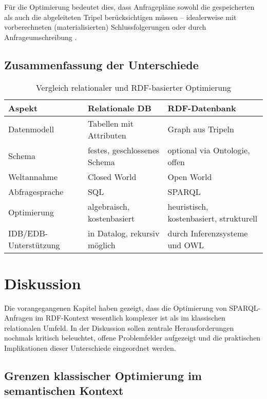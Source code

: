 \documentclass[12pt]{article}
\begin{document}
Für die Optimierung bedeutet dies, dass Anfragepläne sowohl die gespeicherten als auch die abgeleiteten Tripel berücksichtigen müssen – idealerweise mit vorberechneten (materialisierten) Schlussfolgerungen oder durch Anfrageumschreibung \cite{motik2007sparql}.

\subsection{Zusammenfassung der Unterschiede}

\vspace{0.5em}
\begin{table}[h]
\centering
\caption{Vergleich relationaler und RDF-basierter Optimierung}
\begin{tabular}{|p{4.5cm}|p{5cm}|p{5cm}|}
\hline
\textbf{Aspekt} & \textbf{Relationale DB} & \textbf{RDF-Datenbank} \\
\hline
Datenmodell & Tabellen mit Attributen & Graph aus Tripeln \\
Schema & festes, geschlossenes Schema & optional via Ontologie, offen \\
Weltannahme & Closed World & Open World \\
Abfragesprache & SQL & SPARQL \\
Optimierung & algebraisch, kostenbasiert & heuristisch, kostenbasiert, strukturell \\
IDB/EDB-Unterstützung & in Datalog, rekursiv möglich & durch Inferenzsysteme und OWL \\
\hline
\end{tabular}
\end{table}


\section{Diskussion} \label{sec:diskussion}

Die vorangegangenen Kapitel haben gezeigt, dass die Optimierung von SPARQL-Anfragen im RDF-Kontext wesentlich komplexer ist als im klassischen relationalen Umfeld. In der Diskussion sollen zentrale Herausforderungen nochmals kritisch beleuchtet, offene Problemfelder aufgezeigt und die praktischen Implikationen dieser Unterschiede eingeordnet werden.

\subsection{Grenzen klassischer Optimierung im semantischen Kontext}
\end{document}

